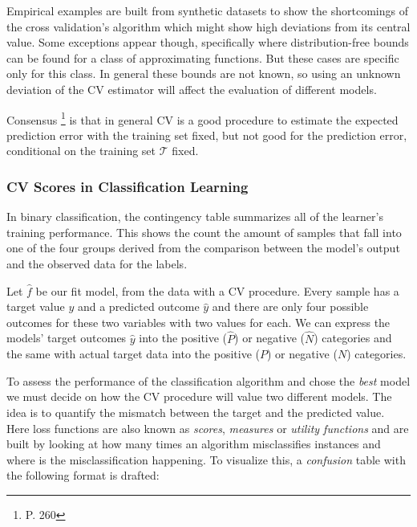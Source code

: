 Empirical examples are built from synthetic datasets to show the shortcomings of the cross validation's algorithm which might show high deviations from its central value. Some exceptions appear though, specifically where distribution-free bounds can be found for a class of approximating functions. But these cases are specific only for this class. In general these bounds are not known, so using an unknown deviation of the CV estimator will affect the evaluation of different models.

Consensus \footnote{\textcite{hastie-elemstatslearn} P. 260} is that in general CV is a good procedure to estimate the expected prediction error with the training set fixed, but not good for the prediction error, conditional on the training set $\mathcal{T}$ fixed.



\subsubsection{CV Scores in Classification Learning}

In binary classification, the contingency table summarizes all of the learner's training performance. This shows the count the amount of samples that fall into one of the four groups derived from the comparison between the model's output and the observed data for the labels.

 Let $\hat{f}$ be our fit model, from the data with a CV procedure. Every sample has a target value $y$ and a predicted outcome $\hat{y}$ and there are only four possible outcomes for these two variables with two values for each.  We can express the models' target outcomes $\hat{y}$ into the positive ($\hat{P}$) or negative ($\hat{N}$) categories and the same with actual target data into the positive ($P$) or negative ($N$) categories.

To assess the performance of the classification algorithm and chose the \textit{best} model we must decide on how the CV procedure will value two different models. The idea is to quantify the mismatch between the target  and the predicted value. Here loss functions are also known as \textit{scores}, \textit{measures} or \textit{utility functions} and are built by looking at how many times an algorithm  misclassifies instances and where is the misclassification happening. To visualize this, a \textit{confusion} table with the following format is drafted:

